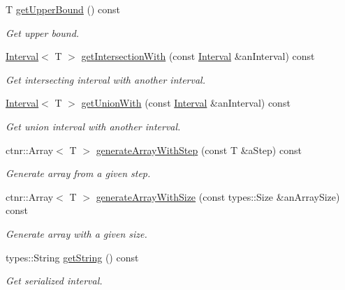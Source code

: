 \begin{DoxyCompactItemize}
T \hyperlink{classlibrary_1_1math_1_1obj_1_1_interval_a97d09e9c5e7f67b6ddf162af01a8066e}{get\+Upper\+Bound} () const
\begin{DoxyCompactList}\small\item\em Get upper bound. \end{DoxyCompactList}\item 
\hyperlink{classlibrary_1_1math_1_1obj_1_1_interval}{Interval}$<$ T $>$ \hyperlink{classlibrary_1_1math_1_1obj_1_1_interval_a2f23ca14d71c454417270218132423de}{get\+Intersection\+With} (const \hyperlink{classlibrary_1_1math_1_1obj_1_1_interval}{Interval} \&an\+Interval) const
\begin{DoxyCompactList}\small\item\em Get intersecting interval with another interval. \end{DoxyCompactList}\item 
\hyperlink{classlibrary_1_1math_1_1obj_1_1_interval}{Interval}$<$ T $>$ \hyperlink{classlibrary_1_1math_1_1obj_1_1_interval_a4183db388b6a63429a031d3687b20ecf}{get\+Union\+With} (const \hyperlink{classlibrary_1_1math_1_1obj_1_1_interval}{Interval} \&an\+Interval) const
\begin{DoxyCompactList}\small\item\em Get union interval with another interval. \end{DoxyCompactList}\item 
ctnr\+::\+Array$<$ T $>$ \hyperlink{classlibrary_1_1math_1_1obj_1_1_interval_aef3fddb9522a6e976499436e156bfe1d}{generate\+Array\+With\+Step} (const T \&a\+Step) const
\begin{DoxyCompactList}\small\item\em Generate array from a given step. \end{DoxyCompactList}\item 
ctnr\+::\+Array$<$ T $>$ \hyperlink{classlibrary_1_1math_1_1obj_1_1_interval_a250e05a1f463f107952b437e5ff4f4d2}{generate\+Array\+With\+Size} (const types\+::\+Size \&an\+Array\+Size) const
\begin{DoxyCompactList}\small\item\em Generate array with a given size. \end{DoxyCompactList}\item 
types\+::\+String \hyperlink{classlibrary_1_1math_1_1obj_1_1_interval_aedaaa7c1b22246a1bf387e070d17f47f}{get\+String} () const
\begin{DoxyCompactList}\small\item\em Get serialized interval. \end{DoxyCompactList}\item 

\end{DoxyCompactItemize}
